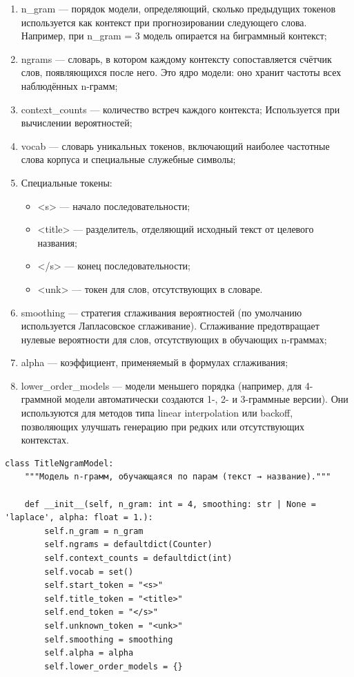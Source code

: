 \documentclass[coursework]{SCWorks}
\begin{document}
    \begin{enumerate}
        \item {n\_gram} — порядок модели, определяющий, сколько предыдущих токенов используется как контекст при
        прогнозировании следующего слова.
        Например, при n\_gram = 3 модель опирается на биграммный контекст;
        \item {ngrams} — словарь, в котором каждому контексту сопоставляется счётчик слов, появляющихся после него.
        Это ядро модели: оно хранит частоты всех наблюдённых n-грамм;
        \item {context\_counts} — количество встреч каждого контекста;
        Используется при вычислении вероятностей;
        \item {vocab} — словарь уникальных токенов, включающий наиболее частотные слова корпуса и специальные служебные символы;
        \item {Специальные токены}:
        \begin{itemize}
            \item <s> — начало последовательности;
            \item <title> — разделитель, отделяющий исходный текст от целевого названия;
            \item </s> — конец последовательности;
            \item <unk> — токен для слов, отсутствующих в словаре.
        \end{itemize}
        \item {smoothing} — стратегия сглаживания вероятностей (по умолчанию используется Лапласовское сглаживание).
        Сглаживание предотвращает нулевые вероятности для слов, отсутствующих в обучающих n-граммах;
        \item {alpha} — коэффициент, применяемый в формулах сглаживания;
        \item {lower\_order\_models} — модели меньшего порядка
        (например, для 4-граммной модели автоматически создаются 1-, 2- и 3-граммные версии).
        Они используются для методов типа {linear interpolation} или {backoff},
        позволяющих улучшать генерацию при редких или отсутствующих контекстах.
    \end{enumerate}

    \begin{verbatim}
class TitleNgramModel:
    """Модель n-грамм, обучающаяся по парам (текст → название)."""

    def __init__(self, n_gram: int = 4, smoothing: str | None = 'laplace', alpha: float = 1.):
        self.n_gram = n_gram
        self.ngrams = defaultdict(Counter)
        self.context_counts = defaultdict(int)
        self.vocab = set()
        self.start_token = "<s>"
        self.title_token = "<title>"
        self.end_token = "</s>"
        self.unknown_token = "<unk>"
        self.smoothing = smoothing
        self.alpha = alpha
        self.lower_order_models = {}
    \end{verbatim}
\end{document}
